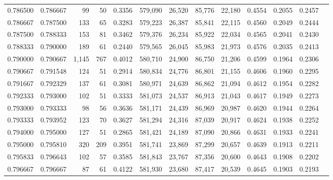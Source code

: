 \begin{tabular}{rrrrrrrrrrrrr}
0.786500 & 0.786667 &    99 &  50 &                                     0.3356 & 579,090 &  26,520 &  85,776 &  22,180 & 0.4554 & 0.2055 & 0.2457 \\
0.786667 & 0.787500 &   133 &  65 &                                     0.3283 & 579,223 &  26,387 &  85,841 &  22,115 & 0.4560 & 0.2049 & 0.2444 \\
0.787500 & 0.788333 &   153 &  81 &                                     0.3462 & 579,376 &  26,234 &  85,922 &  22,034 & 0.4565 & 0.2041 & 0.2430 \\
0.788333 & 0.790000 &   189 &  61 &                                     0.2440 & 579,565 &  26,045 &  85,983 &  21,973 & 0.4576 & 0.2035 & 0.2413 \\
0.790000 & 0.790667 & 1,145 & 767 &                                     0.4012 & 580,710 &  24,900 &  86,750 &  21,206 & 0.4599 & 0.1964 & 0.2306 \\
0.790667 & 0.791548 &   124 &  51 &                                     0.2914 & 580,834 &  24,776 &  86,801 &  21,155 & 0.4606 & 0.1960 & 0.2295 \\
0.791667 & 0.792329 &   137 &  61 &                                     0.3081 & 580,971 &  24,639 &  86,862 &  21,094 & 0.4612 & 0.1954 & 0.2282 \\
0.792333 & 0.793000 &   102 &  51 &                                     0.3333 & 581,073 &  24,537 &  86,913 &  21,043 & 0.4617 & 0.1949 & 0.2273 \\
0.793000 & 0.793333 &    98 &  56 &                                     0.3636 & 581,171 &  24,439 &  86,969 &  20,987 & 0.4620 & 0.1944 & 0.2264 \\
0.793333 & 0.793952 &   123 &  70 &                                     0.3627 & 581,294 &  24,316 &  87,039 &  20,917 & 0.4624 & 0.1938 & 0.2252 \\
0.794000 & 0.795000 &   127 &  51 &                                     0.2865 & 581,421 &  24,189 &  87,090 &  20,866 & 0.4631 & 0.1933 & 0.2241 \\
0.795000 & 0.795810 &   320 & 209 &                                     0.3951 & 581,741 &  23,869 &  87,299 &  20,657 & 0.4639 & 0.1913 & 0.2211 \\
0.795833 & 0.796643 &   102 &  57 &                                     0.3585 & 581,843 &  23,767 &  87,356 &  20,600 & 0.4643 & 0.1908 & 0.2202 \\
0.796667 & 0.796667 &    87 &  61 &                                     0.4122 & 581,930 &  23,680 &  87,417 &  20,539 & 0.4645 & 0.1903 & 0.2193 \\

\end{tabular}
